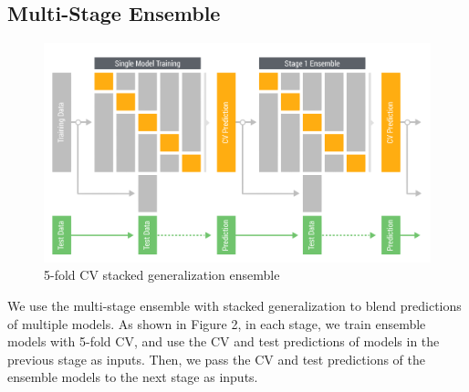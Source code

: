 \subsection{Multi-Stage Ensemble}

\begin{figure}[!h]
  \caption{5-fold CV stacked generalization ensemble}
  \centering
    \includegraphics[width=0.5 \textwidth]{cv_ensemble}
\end{figure}

We use the multi-stage ensemble with stacked generalization \cite{wolpert1992stacked, ting1999issues} to blend predictions of multiple models.  As shown in Figure 2, in each stage, we train ensemble models with 5-fold CV, and use the CV and test predictions of models in the previous stage as inputs.  Then, we pass the CV and test predictions of the ensemble models to the next stage as inputs.\\




